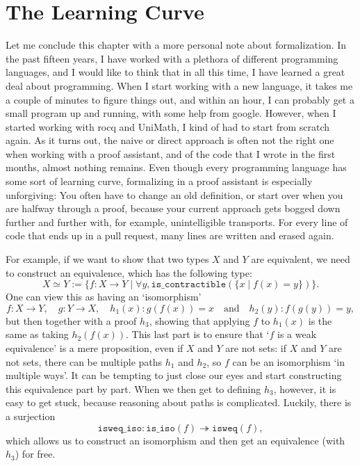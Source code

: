 \section{The Learning Curve}
Let me conclude this chapter with a more personal note about formalization. In the past fifteen years, I have worked with a plethora of different programming languages, and I would like to think that in all this time, I have learned a great deal about programming. When I start working with a new language, it takes me a couple of minutes to figure things out, and within an hour, I can probably get a small program up and running, with some help from google. However, when I started working with rocq and UniMath, I kind of had to start from scratch again. As it turns out, the naive or direct approach is often not the right one when working with a proof assistant, and of the code that I wrote in the first months, almost nothing remains. Even though every programming language has some sort of learning curve, formalizing in a proof assistant is especially unforgiving: You often have to change an old definition, or start over when you are halfway through a proof, because your current approach gets bogged down further and further with, for example, unintelligible transports. For every line of code that ends up in a pull request, many lines are written and erased again.

For example, if we want to show that two types $ X $ and $ Y $ are equivalent, we need to construct an equivalence, which has the following type:
\[ X \simeq Y := \{ f : X \to Y \mid \forall y, \mathtt{is\_contractible}(\{ x \mid f(x) = y \}) \}. \]
One can view this as having an `isomorphism'
\[ f: X \to Y, \quad g : Y \to X, \quad h_1(x): g(f(x)) = x \quad \text{and} \quad h_2(y) : f(g(y)) = y, \]
but then together with a proof $ h_3 $, showing that applying $ f $ to $ h_1(x) $ is the same as taking $ h_2(f(x)) $. This last part is to ensure that `$ f $ is a weak equivalence' is a mere proposition, even if $ X $ and $ Y $ are not sets: if $ X $ and $ Y $ are not sets, there can be multiple paths $ h_1 $ and $ h_2 $, so $ f $ can be an isomorphism `in multiple ways'. It can be tempting to just close our eyes and start constructing this equivalence part by part. When we then get to defining $ h_3 $, however, it is easy to get stuck, because reasoning about paths is complicated. Luckily, there is a surjection
\[ \mathtt{isweq\_iso} : \mathtt{is\_iso}(f) \twoheadrightarrow \mathtt{isweq}(f), \]
which allows us to construct an isomorphism and then get an equivalence (with $ h_3 $) for free.

